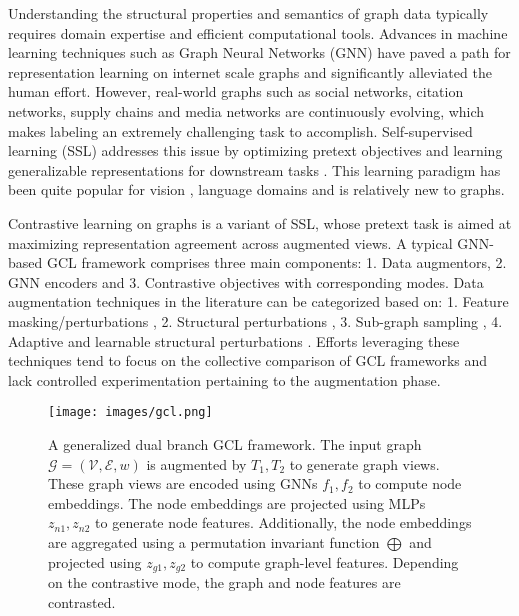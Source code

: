 \documentclass{article}
\def\gE{{\mathcal{E}}}
\def\gG{{\mathcal{G}}}
\def\gV{{\mathcal{V}}}
\theoremstyle{plain}
\theoremstyle{definition}
\theoremstyle{remark}
\begin{document}
Understanding the structural properties and semantics of graph data typically requires domain expertise and efficient computational tools.  Advances in machine learning techniques such as Graph Neural Networks (GNN) \citep{gori2005new, scarselli2008graph, bruna2014spectral, henaff2015deep, welling2016semi, niepert2016learning, bronstein2017geometric, xu2018powerful, wu2020comprehensive, zhou2020graph} have paved a path for representation learning on internet scale graphs and significantly alleviated the human effort. However, real-world graphs such as social networks, citation networks, supply chains and media networks are continuously evolving, which makes labeling an extremely challenging task to accomplish. Self-supervised learning (SSL) addresses this issue by optimizing pretext objectives and learning generalizable representations for downstream tasks \citep{jin2020self, wu2021self, liu2022graph, xie2022self}. This learning paradigm has been quite popular for vision \citep{gidaris2018unsupervised, hjelm2018learning, chen2020simple, jing2020self}, language domains \citep{mikolov2013efficient, devlin2018bert, radford2018improving, lan2019albert} and is relatively new to graphs.

Contrastive learning on graphs \citep{velickovic2019deep, sun2019infograph, zhu2020deep, you2020graph, hassani2020contrastive} is a variant of SSL, whose pretext task is aimed at maximizing representation agreement across augmented views. A typical GNN-based GCL framework comprises three main components: 1. Data augmentors, 2. GNN encoders and 3. Contrastive objectives with corresponding modes. Data augmentation techniques in the literature can be categorized based on: 1. Feature masking/perturbations \citep{you2020graph, thakoor2021bootstrapped}, 2. Structural perturbations \citep{you2020graph, hassani2020contrastive, zeng2021contrastive}, 3. Sub-graph sampling \citep{hu2019strategies, qiu2020gcc, jiao2020sub, zhu2021transfer}, 4. Adaptive and learnable structural perturbations \citep{zhu2021graph, yin2022autogcl}. Efforts leveraging these techniques tend to focus on the collective comparison of GCL frameworks and lack controlled experimentation pertaining to the augmentation phase. 

\begin{figure*}[ht]
\vskip 0.2in
\begin{center}
\centerline{\texttt{[image: images/gcl.png]}}
\caption{A generalized dual branch GCL framework. The input graph $\gG=(\gV, \gE, w)$ is augmented by $T_1, T_2$ to generate graph views. These graph views are encoded using GNNs $f_1, f_2$ to compute node embeddings. The node embeddings are projected using MLPs $z_{n1}, z_{n2}$ to generate node features. Additionally, the node embeddings are aggregated using a permutation invariant function $\bigoplus$ and projected using $z_{g1}, z_{g2}
$ to compute graph-level features. Depending on the contrastive mode, the graph and node features are contrasted.} 
\label{fig:gcl}
\end{center}
\vskip -0.2in
\end{figure*}
\end{document}
